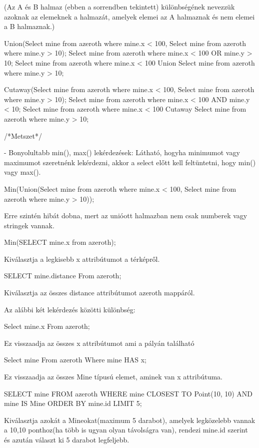 \begin{sql}
(Az A és B halmaz (ebben a sorrendben tekintett) különbségének nevezzük azoknak az elemeknek a halmazát, amelyek elemei az A halmaznak és nem elemei a B halmaznak.)

\begin{sql}
Union(Select mine from azeroth where mine.x < 100, Select mine from azeroth where mine.y > 10);
Select mine from azeroth where mine.x < 100 OR mine.y > 10;
Select mine from azeroth where mine.x < 100 Union Select mine from azeroth where mine.y > 10;
\end{sql}

\begin{sql}
Cutaway(Select mine from azeroth where mine.x < 100, Select mine from azeroth where mine.y > 10);
Select mine from azeroth where mine.x < 100 AND mine.y < 10;
Select mine from azeroth where mine.x < 100 Cutaway Select mine from azeroth where mine.y > 10;
\end{sql}

/*Metszet*/

- Bonyolultabb min(), max() lekérdezések: Látható, hogyha minimumot vagy maximumot szeretnénk lekérdezni, akkor a select előtt kell feltüntetni, hogy min() vagy max().

\begin{sql}
Min(Union(Select mine from azeroth where mine.x < 100, Select mine from azeroth where mine.y > 10));
\end{sql}
Erre szintén hibát dobna, mert az unióott halmazban nem csak numberek vagy stringek vannak.

\begin{sql}
Min(SELECT mine.x from azeroth);
\end{sql}
Kiválasztja a legkisebb x attribútumot a térképről.

\begin{sql}
SELECT mine.distance From azeroth;
\end{sql}
Kiválasztja az összes distance attribútumot azeroth mappáról.

Az alábbi két lekérdezés közötti különbség:
\begin{sql}
Select mine.x From azeroth; 
\end{sql}
Ez visszaadja az összes x attribútumot ami a pályán található
\begin{sql}
Select mine From azeroth Where mine HAS x;
\end{sql}
Ez visszaadja az összes Mine típusú elemet, aminek van x attribútuma.

\begin{sql}
SELECT mine
FROM azeroth
WHERE mine CLOSEST TO Point(10, 10) AND mine IS Mine
ORDER BY mine.id
LIMIT 5;
\end{sql}
Kiválasztja azokát a Mineokat(maximum 5 darabot), amelyek legközelebb vannak a 10,10 ponthoz(ha több is ugyan olyan távolságra van), 
rendezi mine.id szerint és azután választ ki 5 darabot legfeljebb.


\end{sql}
